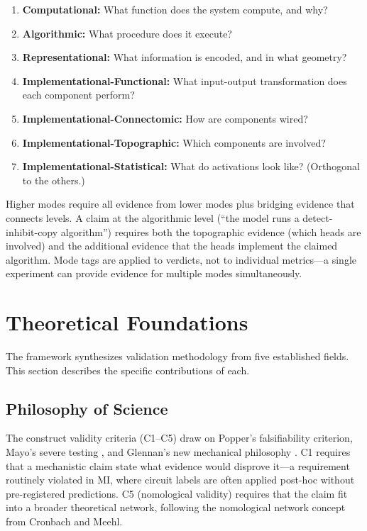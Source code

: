 \documentclass[10pt]{article}
\begin{document}
\begin{enumerate}[nosep]
    \item \textbf{Computational:} What function does the system compute, and why?
    \item \textbf{Algorithmic:} What procedure does it execute?
    \item \textbf{Representational:} What information is encoded, and in what geometry?
    \item \textbf{Implementational-Functional:} What input-output transformation does each component perform?
    \item \textbf{Implementational-Connectomic:} How are components wired?
    \item \textbf{Implementational-Topographic:} Which components are involved?
    \item \textbf{Implementational-Statistical:} What do activations look like? (Orthogonal to the others.)
\end{enumerate}

Higher modes require all evidence from lower modes plus bridging evidence that connects levels. A claim at the algorithmic level (``the model runs a detect-inhibit-copy algorithm'') requires both the topographic evidence (which heads are involved) and the additional evidence that the heads implement the claimed algorithm. Mode tags are applied to verdicts, not to individual metrics---a single experiment can provide evidence for multiple modes simultaneously.

\section{Theoretical Foundations}
\label{sec:foundations}

The framework synthesizes validation methodology from five established fields. This section describes the specific contributions of each.

\subsection{Philosophy of Science}
\label{sec:phil-sci}

The construct validity criteria (C1--C5) draw on Popper's falsifiability criterion, Mayo's severe testing \citep{mayo2018statistical}, and Glennan's new mechanical philosophy \citep{glennan2017new}. C1 requires that a mechanistic claim state what evidence would disprove it---a requirement routinely violated in MI, where circuit labels are often applied post-hoc without pre-registered predictions. C5 (nomological validity) requires that the claim fit into a broader theoretical network, following the nomological network concept from Cronbach and Meehl.
\end{document}
